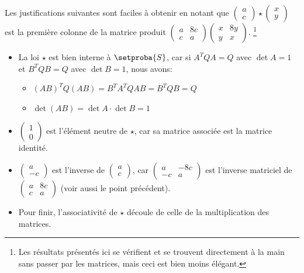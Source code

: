 \medskip

Les justifications suivantes sont faciles à obtenir en notant que
$\begin{pmatrix}
  a \\
  c
\end{pmatrix}
\star
\begin{pmatrix}
  x \\
  y
\end{pmatrix}$
est la première colonne de la matrice produit
$\begin{pmatrix}
  a & 8c \\
  c & a
\end{pmatrix}
\begin{pmatrix}
  x & 8y \\
  y & x
\end{pmatrix}$.
\footnote{
	Les résultats présentés ici se vérifient et se trouvent directement à la main sans passer par les matrices, mais ceci est bien moins élégant.
}


\begin{itemize}
	\item La loi $\star$ est bien interne à $\setproba{S}$, car si $A^T Q A = Q$ avec $\det A = 1$ et $B^T Q B = Q$ avec $\det B = 1$, nous avons:

	\begin{itemize}
		\item $(AB)^T Q (AB) = B^T A^T Q A B = B^T Q B = Q$

		\medskip
		\item $\det(AB) = \det A \cdot \det B = 1$
	\end{itemize}


	\medskip
	\item
	$\begin{pmatrix}
	  1 \\
	  0
	\end{pmatrix}$
	est l'élément neutre de $\star$, car sa matrice associée est la matrice identité.


	\medskip
	\item
	$\begin{pmatrix}
	  a  \\
	  -c
	\end{pmatrix}$
	est l'inverse de
	$\begin{pmatrix}
	  a \\
	  c
	\end{pmatrix}$,
	car
	$\begin{pmatrix}
	  a  & -8c \\
	  -c & a
	\end{pmatrix}$
	est l'inverse matriciel de
	$\begin{pmatrix}
	  a & 8c \\
	  c & a
	\end{pmatrix}$
    (voir aussi le point précédent).


	\medskip
	\item Pour finir, l'associativité de $\star$ découle de celle de la multiplication des matrices.
\end{itemize}
